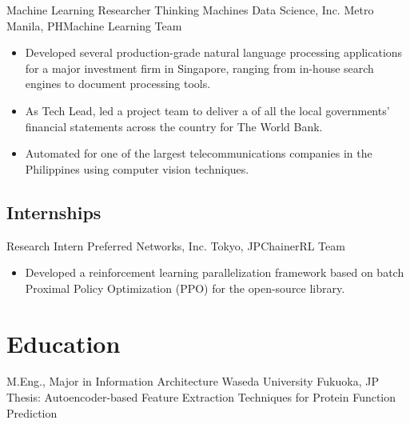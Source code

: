 \documentclass[12pt,a4paper]{moderncv}
\begin{document}
{Machine Learning Researcher}
{Thinking Machines Data Science, Inc.}
{Metro Manila, PH}{Machine Learning Team}
{
    \begin{itemize}
        \item Developed several production-grade natural language processing
        applications for a major investment firm in Singapore, ranging from
        in-house search engines to document processing tools.
        \item As Tech Lead, led a project team to deliver a {\color{blue}
        } of
        all the local governments' financial statements across the country for
        The World Bank.
        \item Automated {\color{blue}}
        for one of the largest telecommunications companies in the Philippines
        using computer vision techniques.
    \end{itemize}
}
\vspace{0.5em}

\subsection{Internships}
{Research Intern}
{Preferred Networks, Inc.}
{Tokyo, JP}{ChainerRL Team}
{
    \begin{itemize}
        \item Developed a reinforcement learning parallelization framework
            based on batch Proximal Policy Optimization (PPO) for the
            open-source
            {\color{blue}}
            library.
    \end{itemize}
}
\vspace{0.5em}

\section{Education}
{M.Eng., Major in Information Architecture}
{Waseda University}
{Fukuoka, JP}{}
{Thesis: Autoencoder-based Feature Extraction Techniques for Protein
    Function Prediction}
\vspace{0.5em}
\end{document}
